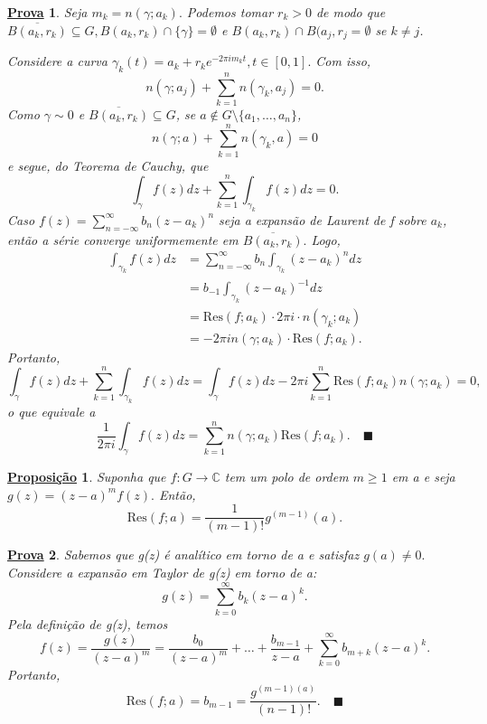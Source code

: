 \documentclass{article}
\newtheorem*{proof*}{\underline{Prova}}
\newtheorem*{prop*}{\underline{Proposi\c c\~ao}}
\renewcommand\qedsymbol{$\blacksquare$}
\begin{document}
  \begin{proof*}
    Seja \(m_{k} = n(\gamma ; a_{k}).\) Podemos tomar \(r_{k}>0\) de modo que \(\overline{B(a_{k}, r_{k})}\subseteq G, B(a_{k}, r_{k})\cap\{\gamma \}=\emptyset \) e 
    \(B(a_{k}, r_{k})\cap B(a_{j}, r_{j} = \emptyset \) se \(k\neq j\).

    Considere a curva \(\gamma_{k}(t) = a_{k} + r_{k}e^{-2\pi i m_{k}t},t\in[0, 1].\) Com isso,
    \[
      n(\gamma ; a_{j}) + \sum\limits_{k=1}^{n}n(\gamma_{k}, a_{j}) = 0.
    \]
    Como \(\gamma \sim 0\) e \(\overline{B(a_{k}, r_{k})}\subseteq G\), se \(a\not\in G\setminus{\{a_{1},\dotsc ,a_{n}\}}\),
    \[
      n(\gamma ; a) + \sum\limits_{k=1}^{n}n(\gamma_{k}, a) = 0
    \]
    e segue, do Teorema de Cauchy, que 
    \[
      \int_{\gamma }^{}f(z)dz + \sum\limits_{k=1}^{n}\int_{\gamma_{k}}^{}f(z)dz = 0.
    \]
    Caso \(f(z) = \sum\limits_{n=-\infty}^{\infty}b_{n}(z-a_{k})^{n}\) seja a expansão de Laurent de f sobre \(a_{k}\), então a série converge uniformemente
    em \(\overline{B(a_{k}, r_{k})}.\) Logo,
    \begin{align*}
      \int_{\gamma_{k}}^{}f(z)dz &= \sum\limits_{n=-\infty}^{\infty}b_{n}\int_{\gamma_{k}}^{}(z-a_{k})^{n}dz\\
                                 &= b_{-1}\int_{\gamma_{k}}^{}(z-a_{k})^{-1}dz\\
                                 &= \mathrm{Res}(f; a_{k})\cdot 2\pi i \cdot n(\gamma_{k}; a_{k})\\
                                 &= -2\pi i n(\gamma ; a_{k})\cdot \mathrm{Res}(f; a_{k}).
    \end{align*}
    Portanto, 
    \[
      \int_{\gamma }^{}f(z)dz + \sum\limits_{k=1}^{n}\int_{\gamma_{k}}^{}f(z)dz = \int_{\gamma }^{}f(z)dz - 2\pi i \sum\limits_{k=1}^{n}\mathrm{Res}(f; a_{k})n(\gamma ; a_{k}) = 0,
    \]
    o que equivale a 
    \[
      \frac{1}{2\pi i}\int_{\gamma }^{}f(z)dz = \sum\limits_{k=1}^{n}n(\gamma ; a_{k})\mathrm{Res}(f; a_{k}).\quad \text{\qedsymbol}
    \]
  \end{proof*}
  \begin{prop*}
    Suponha que \(f:G\rightarrow \mathbb{C}\) tem um polo de ordem \(m \geq 1\) em a e seja \(g(z) = (z-a)^{m}f(z).\) Então,
    \[
      \mathrm{Res}(f; a) = \frac{1}{(m-1)!}g^{(m-1)}(a).
    \]
  \end{prop*}
  \begin{proof*}
    Sabemos que g(z) é analítico em torno de a e satisfaz \(g(a)\neq 0.\) Considere a expansão em Taylor de g(z) em torno de a:
    \[
      g(z) = \sum\limits_{k=0}^{\infty}b_{k}(z-a)^{k}.
    \]
    Pela definição de g(z), temos 
    \[
      f(z) = \frac{g(z)}{(z-a)^{m}} = \frac{b_{0}}{(z-a)^{m}} + \dotsc + \frac{b_{m-1}}{z-a} + \sum\limits_{k=0}^{\infty}b_{m+k}(z-a)^{k}. 
    \]
    Portanto,
    \[
      \mathrm{Res}(f; a) = b_{m-1} = \frac{g^{(m-1)(a)}}{(n-1)!}.\quad \text{\qedsymbol}
    \]
  \end{proof*}
\end{document}
